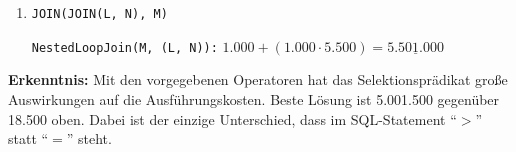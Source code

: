 \begin{enumerate}[a)]
\begin{enumerate}[i)]
\begin{solution}
\begin{enumerate}[1.]
			\item \texttt{JOIN(JOIN(L, N), M)}

			  \texttt{NestedLoopJoin(M, (L, N)):} $1.000 + (1.000 \cdot 5.500) = \underline{5.501.000}$

		\end{enumerate}

		\textbf{Erkenntnis:} Mit den vorgegebenen Operatoren hat das Selektionsprädikat große Auswirkungen auf die Ausführungskosten.
		Beste Lösung ist 5.001.500 gegenüber 18.500 oben.
		Dabei ist der einzige Unterschied, dass im SQL-Statement "`$>$"' statt "`$=$"' steht.

		\end{solution}

	\end{enumerate}

\end{enumerate}

